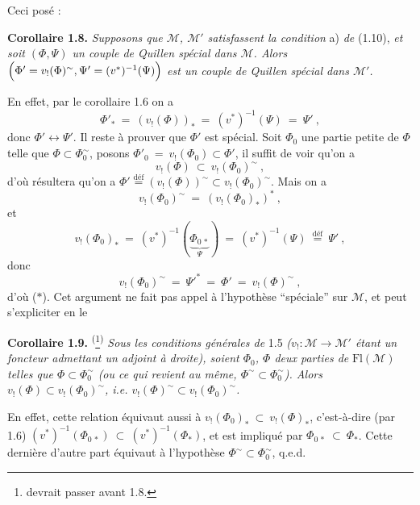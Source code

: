 \documentclass[11pt]{article}
\newcommand{\printedpage}[1]{\marginpar{\footnotesize p.~#1}}
\newcommand{\msp}[1]{\marginpar{\footnotesize [#1]}}
\newcommand{\clos}{\longleftrightarrow}
\newcommand{\fl}{\longrightarrow}
\begin{document}
Ceci posé :

\marginpar{$\Vert$}%
\textbf{Corollaire 1.8.} \textit{Supposons que $\mathcal{M}$, $\mathcal{M}'$ satisfassent la condition} a) \textit{de} (1.10), \textit{et soit $(\Phi, \Psi)$ un couple de Quillen spécial dans $\mathcal{M}$. Alors $\Bigl(\Phi' = v_{!}(\Phi)^{\sim}, \Psi' = (v^{*})^{-1}(\Psi)\Bigr)$ est un couple de Quillen spécial dans $\mathcal{M}'$.}

En effet, par le corollaire 1.6 on a
\[
\Phi'_{*} \ =\ (v_{!}(\Phi))_{*} \ =\ (v^{*})^{-1}(\Psi) \ =\ \Psi'\ ,
\]
donc $\Phi' \clos \Psi'$. Il reste à prouver que $\Phi'$ est spécial. Soit $\Phi_0$ une partie petite de $\Phi$ telle que $\Phi \subset \Phi_0^{\sim}$, posons $\Phi'_0 \ =\ v_{!}(\Phi_0) \subset \Phi'$, \msp{page 9} il suffit de voir qu'on a
\[
v_{!}(\Phi) \ \subset\ v_{!}(\Phi_0)^{\sim}\ , \tag*{($*$)}
\]
d'où résultera qu'on a $\Phi' \overset{\text{déf}}{=} (v_{!}(\Phi))^{\sim} \subset v_{!}(\Phi_0)^{\sim}$. Mais on a
\[
v_{!}(\Phi_0)^{\sim} \ =\ (v_{!}(\Phi_0)_{*})^{*}\ ,
\]
\printedpage{6}
et
\[
v_{!}(\Phi_0)_{*} \ =\ (v^{*})^{-1}(\underbrace{\Phi_{0\,*}}_{\Psi}) \ =\ (v^{*})^{-1}(\Psi) \ \overset{\text{déf}}{=}\ \Psi'\ ,
\]
donc
\[
v_{!}(\Phi_0)^{\sim} \ =\ \Psi'^{*} \ =\ \Phi' \ =\ v_{!}(\Phi)^{\sim}\ ,
\]
d'où ($*$). Cet argument ne fait pas appel à l'hypothèse “spéciale” sur $\mathcal{M}$, et peut s'expliciter en le

\textbf{Corollaire 1.9.} \textsuperscript{(}\footnote[4]{devrait passer avant 1.8.}\textsuperscript{)} \textit{Sous les conditions générales de} 1.5 \textit{($v_{!} : \mathcal{M} \fl \mathcal{M}'$ étant un foncteur admettant un adjoint à droite), soient $\Phi_0$, $\Phi$ deux parties de} $\mathrm{Fl}(\mathcal{M})$ \textit{telles que $\Phi \subset \Phi_0^{\sim}$ (ou ce qui revient au même, $\Phi^{\sim} \subset \Phi_0^{\sim}$). Alors $v_{!}(\Phi) \subset v_{!}(\Phi_0)^{\sim}$, i.e. $v_{!}(\Phi)^{\sim} \subset v_{!}(\Phi_0)^{\sim}$.}

En effet, cette relation équivaut aussi à $v_{!}(\Phi_0)_{*} \ \subset\ v_{!}(\Phi)_{*}$, c'est-à-dire (par 1.6) $(v^{*})^{-1}(\Phi_{0\,*}) \ \subset\ (v^{*})^{-1}(\Phi_{*})$, et est impliqué par $\Phi_{0\,*} \ \subset\ \Phi_{*}$. Cette dernière d'autre part équivaut à l'hypothèse $\Phi^{\sim} \subset \Phi_0^{\sim}$, q.e.d.
\end{document}
